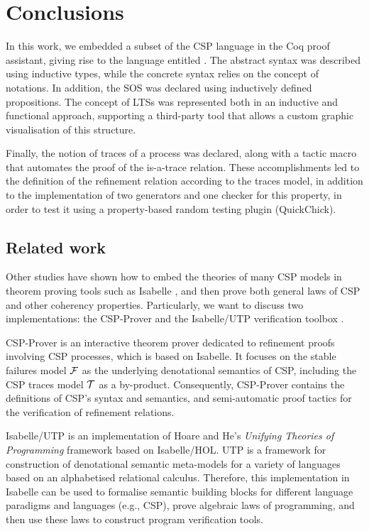 \chapter{Conclusions}

In this work, we embedded a subset of the CSP language in the Coq proof assistant, giving rise to the language entitled \CSPcoq{}. The abstract syntax was described using inductive types, while the concrete syntax relies on the concept of notations. In addition, the SOS was declared using inductively defined propositions. The concept of LTSs was represented both in an inductive and functional approach, supporting a third-party tool that allows a custom graphic visualisation of this structure.

Finally, the notion of traces of a process was declared, along with a tactic macro that automates the proof of the is-a-trace relation. These accomplishments led to the definition of the refinement relation according to the traces model, in addition to the implementation of two generators and one checker for this property, in order to test it using a property-based random testing plugin (QuickChick).

\section{Related work}

Other studies have shown how to embed the theories of many CSP models in theorem proving tools such as Isabelle \cite{nipkow:isabelle}, and then prove both general laws of CSP and other coherency properties. Particularly, we want to discuss two implementations: the CSP-Prover \cite{Roggenbach:CSP-Prover} and the Isabelle/UTP verification toolbox \cite{Woodcock:Isabelle/UTP}.

CSP-Prover is an interactive theorem prover dedicated to refinement proofs involving CSP processes, which is based on Isabelle. It focuses on the stable failures model $ \fmodel $ as the underlying denotational semantics of CSP, including the CSP traces model $ \tmodel $ as a by-product. Consequently, CSP-Prover contains the definitions of CSP's syntax and semantics, and semi-automatic proof tactics for the verification of refinement relations.

Isabelle/UTP is an implementation of Hoare and He's \emph{Unifying Theories of Programming} \cite{hoare:UTP} framework based on Isabelle/HOL. UTP is a framework for construction of denotational semantic meta-models for a variety of languages based on an alphabetised relational calculus. Therefore, this implementation in Isabelle can be used to formalise semantic building blocks for different language paradigms and languages (e.g., CSP), prove algebraic laws of programming, and then use these laws to construct program verification tools. 

